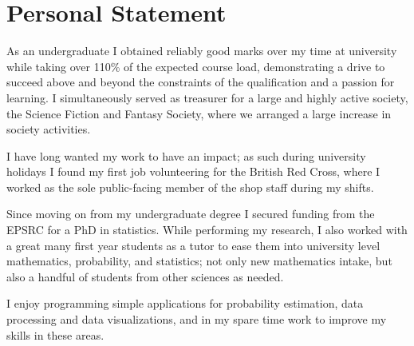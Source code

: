 \documentclass[print, oneside]{friggeri-cv} %
\begin{document}
\section{Personal Statement}
\begin{entrylist}
\entry{}{}{}
{

\quad As an undergraduate I obtained reliably good marks over my time at university while taking over 110\% of the expected course load, demonstrating a drive to succeed above and beyond the constraints of the qualification and a passion for learning.
I simultaneously served as treasurer for a large and highly active society, the Science Fiction and Fantasy Society, where we arranged a large increase in society activities.

\quad I have long wanted my work to have an impact; as such during university holidays I found  my first job volunteering for the British Red Cross, where I worked as the sole public-facing member of the shop staff during my shifts.

\quad Since moving on from my undergraduate degree I secured funding from the EPSRC for a PhD in statistics.
While performing my research, I also worked with a great many first year students as a tutor to ease them into university level mathematics, probability, and statistics; not only new mathematics intake, but also a handful of students from other sciences as needed.

\quad I enjoy programming simple applications for probability estimation, data processing and data visualizations, and in my spare time work to improve my skills in these areas.
}




\end{entrylist}
\end{document}
